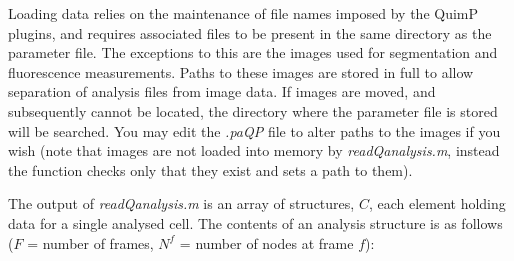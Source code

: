\documentclass[a4paper,12pt]{article}
\begin{document}
Loading data relies on the maintenance
of file names imposed by the QuimP plugins, and requires associated files to
be present in the same directory as the parameter file.
The exceptions to this are the images used for segmentation and fluorescence measurements.  Paths to these images are
stored in full to allow separation of analysis files from image data.  If images are moved, and subsequently cannot
be located, the directory where the parameter file is stored will be searched.  You may edit the \textit{.paQP} file to alter
paths to the images if you wish
(note that images are not loaded into memory by \textit{readQanalysis.m}, instead the function checks only that they exist
and sets a path to them).

The output of \textit{readQanalysis.m} is an array of structures, $C$, each element holding data for a single analysed cell.
The contents of an analysis structure is as follows ($F$ = number of frames, $N^{f}$ = number of nodes at frame $f$):
\end{document}
